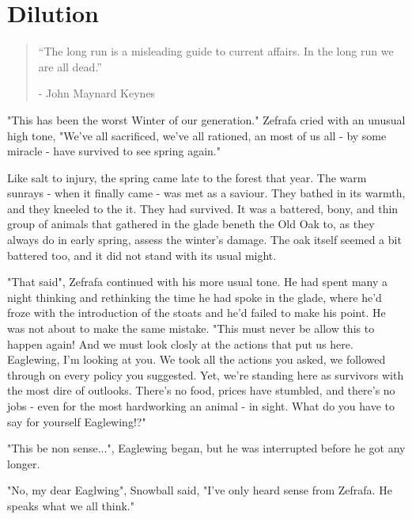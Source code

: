 \chapter{Dilution}

\vspace{-1.3cm}
\begin{localsize}{10}
	\begin{quote}
		“The long run is a misleading guide to current affairs. In the long run we are all dead.” 
		\begin{flushright}- John Maynard Keynes \end{flushright}
	\end{quote} 
\end{localsize}
\vspace{1cm}


"This has been the worst Winter of our generation." Zefrafa cried with an unusual high tone, "We've all sacrificed, we've all rationed, an most of us all - by some miracle - have survived to see spring again."  

Like salt to injury, the spring came late to the forest that year. The warm sunrays - when it finally came - was met as a saviour. They bathed in its warmth, and they kneeled to the it. They had survived.
It was a battered, bony, and thin group of animals that gathered in the glade beneth the Old Oak to, as they always do in early spring, assess the winter's damage. The oak itself seemed a bit battered too, and it did not stand with its usual might.  

"That said", Zefrafa continued with his more usual tone. He had spent many a night thinking and rethinking the time he had spoke in the glade, where he'd froze with the introduction of the stoats and he'd failed to make his point. He was not about to make the same mistake. "This must never be allow this to happen again! And we must look closly at the actions that put us here. Eaglewing, I'm looking at you. We took all the actions you asked, we followed through on every policy you suggested. Yet, we're standing here as survivors with the most dire of outlooks. There's no food, prices have stumbled, and there's no jobs - even for the most hardworking an animal - in sight. What do you have to say for yourself Eaglewing!?"

"This be non sense...", Eaglewing began, but he was interrupted before he got any longer.

"No, my dear Eaglwing", Snowball said, "I've only heard sense from Zefrafa. He speaks what we all think."

